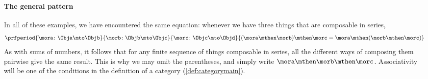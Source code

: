 \paragraph{The general pattern}
In all of these examples, we have encountered the same equation: whenever we have three things that are composable in series,
\begin{equation}
    \label{eq:assoc-generic}
    \prfperiod{
        \mora \colon \Obja \mto \Objb
    }{
        \morb \colon \Objb \mto \Objc
    }{
        \morc \colon \Objc \mto \Objd
    }{
        (\mora \mthen \morb) \mthen \morc = \mora \mthen (\morb \mthen \morc)
    }
\end{equation}
As with sums of numbers, it follows that for any finite sequence of things composable in series, all the different ways of composing them pairwise give the same result. This is why we may omit the parentheses, and simply write $\mora \mthen \morb \mthen \morc$. Associativity will be one of the conditions in the definition of a category (\cref{def:categorymain}).
